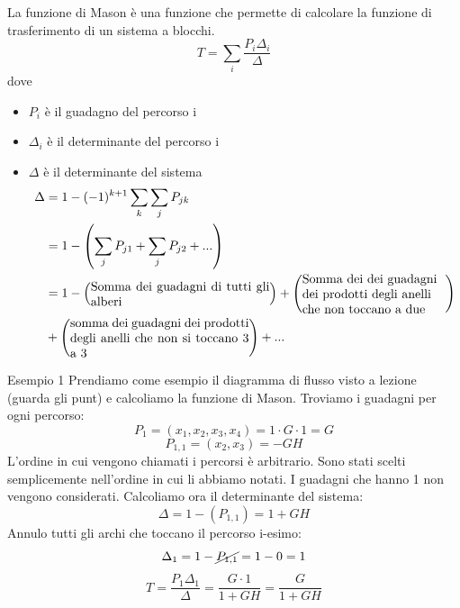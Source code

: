 \documentclass[a4paper]{article}
\begin{document}
\begin{definition}
    La funzione di Mason è una funzione che permette di calcolare la funzione di trasferimento di un sistema a blocchi.
    \[T = \sum_i \frac{P_i \Delta_i}{\Delta} \]
    dove 
    \begin{itemize}
        \item $P_i$ è il guadagno del percorso i
        \item $\Delta_i$ è il determinante del percorso i
        \item $\Delta$ è il determinante del sistema
        \begin{align*}
            \Delta &= 1 - (-1)^{k+1} \sum_k \sum_j P_{jk}\\
            &= 1 - \left(\sum_j P_{j1} + \sum_j P_{j2} + ... \right)\\
            &= 1 - \left(\parbox{5cm}{Somma dei guadagni di tutti gli alberi}\right) + \left(\parbox{4cm}{Somma dei dei guadagni\\dei prodotti degli anelli\\che non toccano a due}\right) \\
            &+ \left(\parbox{5cm}{somma dei guadagni dei prodotti degli anelli che non si toccano 3 a 3}\right) + ...
        \end{align*}
    \end{itemize}       
\end{definition}

\begin{examplebox}{Esempio 1}
    Prendiamo come esempio il diagramma di flusso visto a lezione (guarda gli punt) e calcoliamo la funzione di Mason.
    Troviamo i guadagni per ogni percorso:
    \[P_1 =(x_1, x_2, x_3, x_4) = 1 \cdot G \cdot 1 =  G\]
    \[P_{1,1} = (x_2, x_3) = -GH\]
    L'ordine in cui vengono chiamati i percorsi è arbitrario. Sono stati scelti semplicemente nell'ordine in cui li abbiamo notati.
    I guadagni che hanno 1 non vengono considerati.
    Calcoliamo ora il determinante del sistema:
    \[\Delta = 1 - (P_{1,1}) = 1 + GH\]
    Annulo tutti gli archi che toccano il percorso i-esimo:
    \[\Delta_1 = 1 - \cancel{P_{1,1}} = 1 - 0 = 1\]
    \[T = \frac{P_1 \Delta_1}{\Delta} = \frac{G \cdot 1}{1 + GH} = \frac{G}{1 + GH}\]
\end{examplebox}
\end{document}
